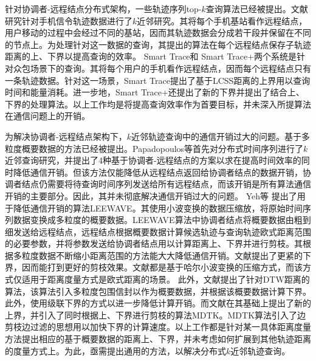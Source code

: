 针对协调者-远程结点分布式架构，一些轨迹序列top-$k$查询算法已经被提出\cite{CIKMSimilarity,SmartTrace,crowdsourced}。文献\cite{CIKMSimilarity}研究针对手机信令轨迹数据进行了$k$近邻研究。其将每个手机基站看作远程结点，用户移动的过程中会经过不同的基站，因而其轨迹数据会分成若干段并保留在不同的节点上。为处理针对这一数据的查询，其提出的算法在每个远程结点保存子轨迹距离的上、下界以提高查询的效率。
Smart Trace\cite{SmartTrace}和 Smart Trace+\cite{crowdsourced}两个系统是针对众包场景下的查询。其将每个用户的手机看作远程结点，因而每个远程结点只有一条轨迹数据。针对这一场景，Smart Trace提出了基于LCSS距离的上界用以查询时间和能量消耗。进一步地，Smart Trace+还提出了新的下界并提出了结合上、下界的处理算法。以上工作均是将提高查询效率作为首要目标，并未深入所提算法在通信问题上的开销。


为解决协调者-远程结点架构下，$k$近邻轨迹查询中的通信开销过大的问题。基于多粒度概要数据的方法已经被提出\cite{PapadopoulosM01,LeeWave,DTKST,bandwidth,bandwidth}。Papadopoulos等\cite{PapadopoulosM01}首先对分布式时间序列进行了$k$近邻查询研究，并提出了4种基于协调者-远程结点的方案以求在提高时间效率的同时降低通信开销。但该方法仅能降低从远程结点返回给协调者结点的数据开销，协调者结点仍需要将待查询时间序列发送给所有远程结点，而该开销是所有算法通信开销的主要部分。因此，其并未彻底解决通信开销过大的问题。
Yeh等 \cite{LeeWave}提出了用于降低通信开销的算法LEEWAVE。其使用小波变换的数据压缩放，将原始时间序列数据变换成多粒度的概要数据。LEEWAVE算法中协调者结点将概要数据由粗到细发送给远程结点，远程结点根据概要数据计算候选轨迹与查询轨迹欧式距离范围的必要参数，并将参数发送给协调者结点用以计算距离上、下界并进行剪枝。其根据多粒度数据不断缩小距离范围的方法能大大降低通信开销。文献\cite{KashyapK11,DTKST}提出了更紧的下界，因而能打到更好的剪枝效果。文献\cite{LeeWave,KashyapK11,DTKST}都是基于哈尔小波变换的压缩方式，而该方式仅适用于距离度量方式是欧式距离的场景。
此外，文献\cite{bandwidth}提出了针对DTW距离的算法，该算法引入多粒度包围信封以作为概要数据，并根据该概要数据计算下界。此外，使用级联下界的方式以进一步降低计算开销。而文献\cite{bandwidth}在其基础上提出了新的上界，并引入了同时根据上、下界进行剪枝的算法MDTK。MDTK算法引入了边剪枝边过滤的思想用以加快下界的计算速度。以上工作都是针对某一具体距离度量方法提出相应的基于概要数据的距离上、下界，并未考虑如何扩展到其他轨迹距离的度量方式上。为此，亟需提出通用的方法，以解决分布式$k$近邻轨迹查询。


\clearpage
\phantom{s}
\clearpage